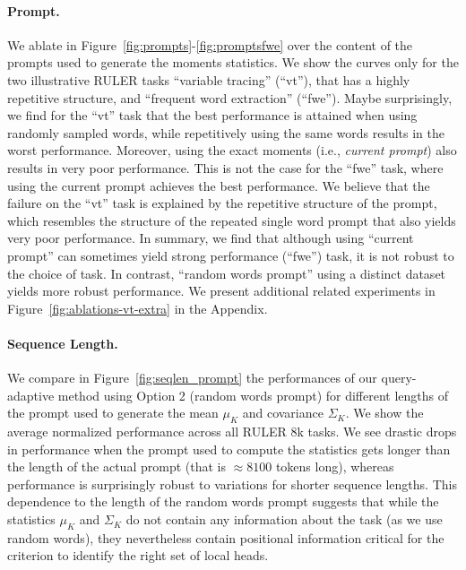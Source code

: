 \paragraph{Prompt.} We ablate in Figure~\ref{fig:prompts}-\ref{fig:promptsfwe} over the content of the prompts used to generate the moments statistics. We show the curves only for the two illustrative RULER tasks ``variable tracing'' (``vt''), that has a highly repetitive structure,  and ``frequent word extraction'' (``fwe'').
Maybe surprisingly, we find for the ``vt'' task that the best performance is attained when using randomly sampled words, while repetitively using the same words results in the worst performance. Moreover, using the exact moments (i.e., \textit{current prompt}) also results in very poor performance. This is not the case for the ``fwe'' task, where using the current prompt achieves the best performance. We believe that the failure on the ``vt'' task is explained by the repetitive structure of the prompt, which resembles the structure of the repeated single word prompt that also yields very poor performance. 
 In summary, we find that although using  ``current prompt'' can sometimes yield strong performance (``fwe'') task, it is not robust to the choice of task. In contrast,  ``random words prompt'' using a distinct dataset yields more robust performance. We present additional related experiments in Figure~\ref{fig:ablations-vt-extra} in the Appendix.
 


\paragraph{Sequence Length.}
We compare in Figure~\ref{fig:seqlen_prompt} the performances of our query-adaptive method using Option 2 (random words prompt) for different lengths of the prompt used to generate the  mean $\mu_K$ and covariance $\Sigma_K$.  We show the average normalized performance across all RULER  $8$k tasks.
We see drastic drops in performance when the prompt used to compute the statistics gets longer than the length of the actual prompt (that is $\approx 8100$ tokens long), whereas performance is surprisingly robust to variations for shorter sequence lengths. This dependence to the length of the random words prompt suggests that while the statistics $\mu_K$ and $\Sigma_K$ do not contain any information about the task (as we use random words), they nevertheless contain positional information critical for the criterion to identify the right set of local heads.













